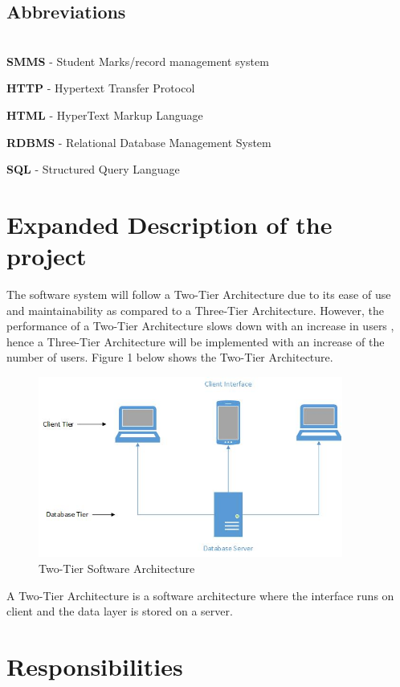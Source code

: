\documentclass[10pt,onecolumn]{lab}
\begin{document}
\subsection{Abbreviations}~\\

\textbf{SMMS} - Student Marks/record management system

\textbf{HTTP} - Hypertext Transfer Protocol

\textbf{HTML} - HyperText Markup Language

\textbf{RDBMS} - Relational Database Management System

\textbf{SQL} - Structured Query Language


\section{Expanded Description of the project}

The software system will follow a Two-Tier Architecture due to its ease of use and maintainability as compared to a Three-Tier Architecture. However, the performance of a Two-Tier Architecture slows down with an increase in users \cite{ref3}, hence a Three-Tier Architecture will be implemented with an increase of the number of users. Figure 1 below shows the Two-Tier Architecture.   
\begin{center}
\begin{figure}[h]
\centering
\includegraphics[width=10cm]{Two-Tier}
\caption{Two-Tier Software Architecture}
\end{figure}
\end{center}


A Two-Tier Architecture is a software architecture where the interface runs on client and the data layer is stored on a server\cite{ref4}.

\section{Responsibilities}
\end{document}
